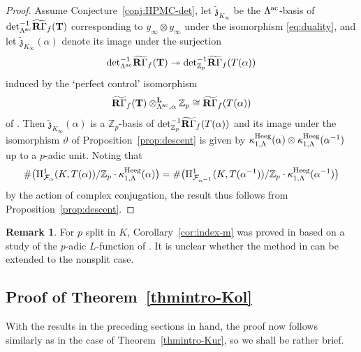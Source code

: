 \documentclass[10pt,reqno]{amsart}
\numberwithin{equation}{section}
\theoremstyle{plain}
\theoremstyle{definition}
\newtheorem{rem}[thm]{Remark}
\theoremstyle{definition}
\theoremstyle{plain}
\theoremstyle{plain}
\theoremstyle{plain}
\theoremstyle{plain}
\theoremstyle{plain}
\theoremstyle{plain}
\newcommand{\Tac}{\mathbf{T}}
\newcommand{\Z}{\mathbb{Z}}
\newcommand{\Fcal}{\mathcal{F}}
\newcommand{\rH}{\mathrm{H}}
\begin{document}
\begin{proof}
Assume Conjecture~\ref{conj:HPMC-det}, let $\widetilde{\mathfrak{z}}_{K_\infty}$ be the $\Lambda^{\rm ac}$-basis of ${\rm det}_{\Lambda^{\rm ac}}^{-1}\widetilde{\mathbf{R}\Gamma}_f(\Tac)$  corresponding to $y_\infty\otimes y_\infty$ under the isomorphism \eqref{eq:duality}, and let $\widetilde{\mathfrak{z}}_{K_\infty}(\alpha)$ denote 
its image under the surjection
$${\rm det}_{\Lambda^{\rm ac}}^{-1}\widetilde{\mathbf{R}\Gamma}_f(\Tac) \twoheadrightarrow 
{\rm det}_{\Z_p}^{-1}\widetilde{\mathbf{R}\Gamma}_f(T(\alpha))$$
induced by the `perfect control' isomorphism
\begin{equation}\label{eq:deriv-control}
\widetilde{\mathbf{R}\Gamma}_f(\Tac)\otimes_{\Lambda^{\rm ac},\alpha}^{\mathbf{L}}\Z_p\cong
\widetilde{\mathbf{R}\Gamma}_f(T(\alpha))
\end{equation}
of \cite[Prop.~8.10.1]{nekovar-310}. 
Then $\widetilde{\mathfrak{z}}_{K_\infty}(\alpha)$ is a $\Z_p$-basis of ${\rm det}_{\Z_p}^{-1}\widetilde{\mathbf{R}\Gamma}_f(T(\alpha))$ and %
its image under the isomorphism $\vartheta$ of Proposition~\ref{prop:descent} is given by $\kappa_{1,\Lambda}^{\rm Heeg}(\alpha)\otimes\kappa_{1,\Lambda}^{\rm Heeg}(\alpha^{-1})$ up to a $p$-adic unit. %
Noting that
\[
\#\bigl(\rH^1_{\Fcal_\alpha}(K,T(\alpha))/\Z_p\cdot\kappa_{1,\Lambda}^{\rm Heeg}(\alpha)\bigr)=\#\bigl(\rH^1_{\Fcal_{\alpha^{-1}}}(K,T(\alpha^{-1}))/\Z_p\cdot\kappa_{1,\Lambda}^{\rm Heeg}(\alpha^{-1})\bigr)
\]
by the action of complex conjugation, the result thus follows from Proposition~\ref{prop:descent}.
\end{proof}

\begin{rem}
For $p$ split in $K$, Corollary~\ref{cor:index-m} was proved in \cite[Cor.~1.2.11]{BCGS} based on a study of the $p$-adic $L$-function of \cite{BDP}. It is unclear whether the method in \cite{BCGS} can be extended to the nonsplit case.
\end{rem}

\subsection{Proof of Theorem~\ref{thmintro-Kol}}

With the results in the preceding sections in hand, the proof now follows similarly as in the case of  Theorem~\ref{thmintro-Kur}, so we shall be rather brief. 
\end{document}
